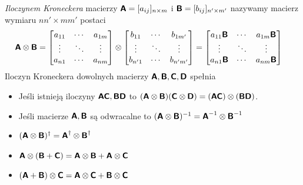 \documentclass{myclass}
\begin{document}
\begin{definition}
\textit{Iloczynem Kroneckera} macierzy \(\boldsymbol{\mathsf{A}} = [a_{ij}]_{n\times m}\) i \(\boldsymbol{\mathsf{B}} =
[b_{ij}]_{n'\times m'}\) nazywamy macierz wymiaru \(nn'\times mm'\) postaci
\begin{equation*}
    \begin{split}
        \oper{A} \otimes \oper{B} &= \mqty[a_{11} & \cdots & a_{1m} \\ \vdots & \ddots & \vdots \\ a_{n1} & \cdots & a_{nm}] \otimes \mqty[b_{11} & \cdots & b_{1m'} \\ \vdots & \ddots & \vdots \\ b_{n'1} & \cdots & b_{n'm'}] = \mqty[a_{11}\oper{B} & \cdots & a_{1m}\oper{B} \\ \vdots & \ddots & \vdots \\ a_{n1}\oper{B} & \cdots & a_{nm}\oper{B}]
    \end{split}
\end{equation*}
Iloczyn Kroneckera dowolnych macierzy \(\boldsymbol{\mathsf{A}},\boldsymbol{\mathsf{B}},\boldsymbol{\mathsf{C}},\boldsymbol{\mathsf{D}}\) spełnia
\begin{itemize}
    \item Jeśli istnieją iloczyny \(\boldsymbol{\mathsf{AC}}, \boldsymbol{\mathsf{BD}}\) to
    \((\boldsymbol{\mathsf{A}}\otimes\boldsymbol{\mathsf{B}})(\boldsymbol{\mathsf{C}}\otimes\boldsymbol{\mathsf{D}}) = (\boldsymbol{\mathsf{AC}})\otimes(\boldsymbol{\mathsf{BD}})\).
    \item Jeśli macierze \(\boldsymbol{\mathsf{A}},\boldsymbol{\mathsf{B}}\) są odwracalne to
    \((\boldsymbol{\mathsf{A}}\otimes\boldsymbol{\mathsf{B}})^{-1}=\boldsymbol{\mathsf{A}}^{-1}\otimes\boldsymbol{\mathsf{B}}^{-1}\)
    \item \((\boldsymbol{\mathsf{A}}\otimes\boldsymbol{\mathsf{B}})^\dagger = \boldsymbol{\mathsf{A}}^\dagger \otimes \boldsymbol{\mathsf{B}}^\dagger\)
    \item \(\boldsymbol{\mathsf{A}}\otimes(\boldsymbol{\mathsf{B}}+\boldsymbol{\mathsf{C}}) = \boldsymbol{\mathsf{A}}\otimes\boldsymbol{\mathsf{B}}+\boldsymbol{\mathsf{A}}\otimes\boldsymbol{\mathsf{C}}\)
    \item \((\boldsymbol{\mathsf{A}}+\boldsymbol{\mathsf{B}})\otimes\boldsymbol{\mathsf{C}} = \boldsymbol{\mathsf{A}}\otimes\boldsymbol{\mathsf{C}}+\boldsymbol{\mathsf{B}}\otimes\boldsymbol{\mathsf{C}}\)
\end{itemize}
\end{definition}
\end{document}
